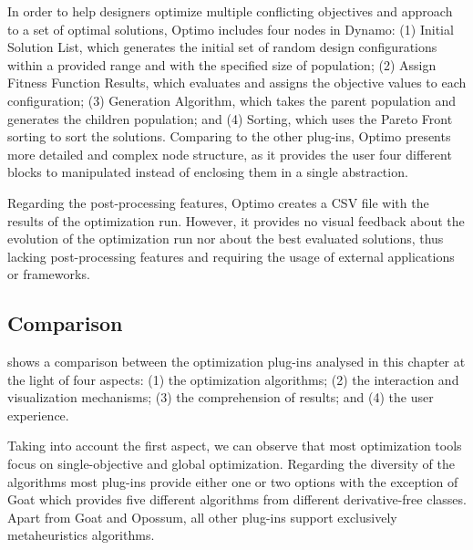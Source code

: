In order to help designers optimize multiple conflicting objectives and approach to a set of optimal solutions, Optimo includes four nodes in Dynamo: (1) Initial Solution List, which generates the initial set of random design configurations within a provided range and with the specified size of population; (2) Assign Fitness Function Results, which evaluates and assigns the objective values to each configuration; (3) Generation Algorithm, which takes the parent population and generates the children population; and (4) Sorting, which uses the Pareto Front sorting to sort the solutions. Comparing to the other plug-ins, Optimo presents more detailed and complex node structure, as it provides the user four different blocks to manipulated instead of enclosing them in a single abstraction.

Regarding the post-processing features, Optimo creates a CSV file with the results of the optimization run. However, it provides no visual feedback about the evolution of the optimization run nor about the best evaluated solutions, thus lacking post-processing features and requiring the usage of external applications or frameworks.

\subsection{Comparison}

 shows a comparison between the optimization plug-ins analysed in this chapter at the light of four aspects: (1) the optimization algorithms; (2) the interaction and visualization mechanisms; (3) the comprehension of results; and (4) the user experience.

Taking into account the first aspect, we can observe that most optimization tools focus on single-objective and global optimization. Regarding the diversity of the algorithms most plug-ins provide either one or two options with the exception of Goat which provides five different algorithms from different derivative-free classes. Apart from Goat and Opossum, all other plug-ins support exclusively metaheuristics algorithms.

